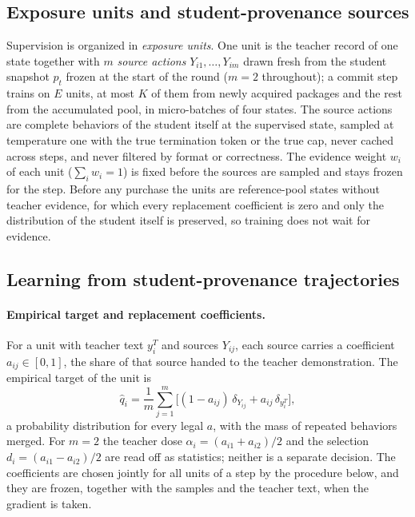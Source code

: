 \subsection{Exposure units and student-provenance sources}\label{sec:explore}

Supervision is organized in \emph{exposure units}. One unit is the
teacher record of one state together with $m$ \emph{source actions}
$Y_{i1},\ldots,Y_{im}$ drawn fresh from the student snapshot $p_t$
frozen at the start of the round ($m=2$ throughout); a commit step
trains on $E$ units, at most $K$ of them from newly acquired packages
and the rest from the accumulated pool, in micro-batches of four
states. The source actions are complete behaviors of the student
itself at the supervised state, sampled at temperature one with the
true termination token or the true cap, never cached across steps,
and never filtered by format or correctness. The evidence weight $w_i$
of each unit ($\sum_i w_i=1$) is fixed before the sources are sampled
and stays frozen for the step. Before any purchase the units are
reference-pool states without teacher evidence, for which every
replacement coefficient is zero and only the distribution of the
student itself is preserved, so training does not wait for evidence.

\subsection{Learning from student-provenance trajectories}\label{sec:distill}

\paragraph{Empirical target and replacement coefficients.}
For a unit with teacher text $y_i^T$ and sources $Y_{ij}$, each
source carries a coefficient $a_{ij}\in[0,1]$, the share of that
source handed to the teacher demonstration. The empirical target of
the unit is
\[
\hat q_i=\frac{1}{m}\sum_{j=1}^{m}\bigl[(1-a_{ij})\,\delta_{Y_{ij}}
+a_{ij}\,\delta_{y_i^T}\bigr],
\]
a probability distribution for every legal $a$, with the mass of
repeated behaviors merged. For $m=2$ the teacher dose
$\alpha_i=(a_{i1}+a_{i2})/2$ and the selection
$d_i=(a_{i1}-a_{i2})/2$ are read off as statistics; neither is a
separate decision. The coefficients are chosen jointly for all units
of a step by the procedure below, and they are frozen, together with
the samples and the teacher text, when the gradient is taken.


